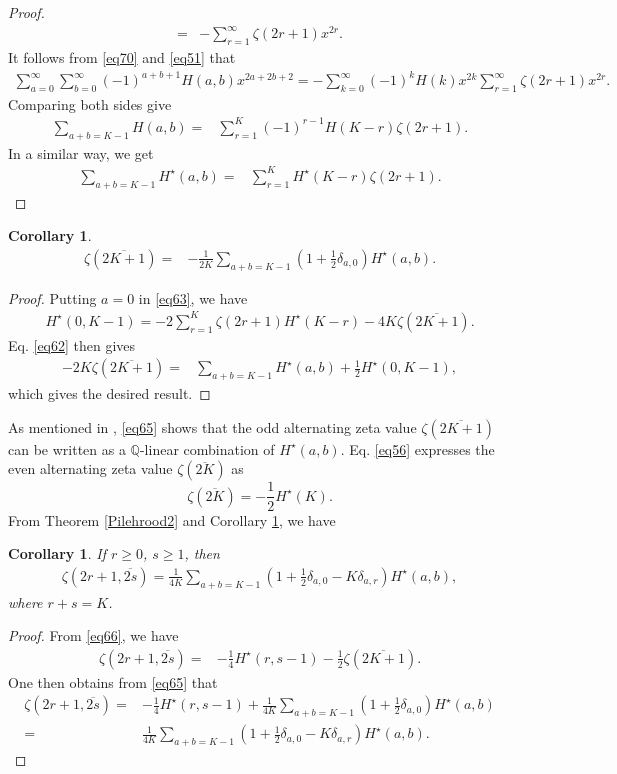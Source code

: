 \documentclass[reqno]{amsart}
\newtheorem{corollary}[theorem]{Corollary}
\theoremstyle{definition}
\theoremstyle{remark}
\numberwithin{equation}{section}
\begin{document}
\begin{proof}
\begin{align*}
=&-\sum_{r=1}^{\infty}\zeta(2r+1)x^{2r}.
\end{align*}
It follows from \eqref{eq70} and \eqref{eq51} that
\begin{align*}
\sum_{a=0}^{\infty}\sum_{b=0}^{\infty}(-1)^{a+b+1}H(a,b)x^{2a+2b+2}=-\sum_{k=0}^{\infty}(-1)^kH(k)x^{2k} \sum_{r=1}^{\infty}\zeta(2r+1)x^{2r}.
\end{align*}
Comparing both sides give
\begin{align*}
\sum_{a+b=K-1}H(a,b)=&\sum_{r=1}^K(-1)^{r-1}H(K-r)\zeta(2r+1).
\end{align*}
In a similar way, we get
\begin{align*}
\sum_{a+b=K-1}H^{\star}(a,b)=& \sum_{r=1}^{K}H^{\star}(K-r)\zeta(2r+1).
\end{align*}
\end{proof}
\begin{corollary}\label{cor2}
\begin{align}\label{eq65}
\zeta(\overline{2K+1})=&-\frac{1}{2K} \sum_{a+b=K-1}\left(1+\frac{1}{2} \delta_{a,0}\right)H^{\star}(a,b).
\end{align}
\end{corollary}
\begin{proof}
Putting $a=0$ in \eqref{eq63}, we have
\begin{align*}
H^{\star}(0, K-1)=-2\sum_{r=1}^K\zeta(2r+1)H^{\star}(K-r)-4K\zeta(\overline{2K+1}).
\end{align*}
Eq. \eqref{eq62} then gives
\begin{align*}
-2K\zeta(\overline{2K+1})=&\sum_{a+b=K-1}H^{\star}(a,b)+\frac{1}{2}H^{\star}(0, K-1),
\end{align*}which gives the desired result.
\end{proof}
As mentioned in \cite{1}, \eqref{eq65} shows that the odd alternating zeta value $\zeta(\overline{2K+1})$ can be written as a $\mathbb{Q}$-linear combination of $H^{\star}(a, b)$. Eq. \eqref{eq56} expresses the even alternating zeta value $\zeta(\overline{2K})$ as
$$\zeta(\overline{2K})=-\frac{1}{2}H^{\star}(K).$$
From Theorem \ref{Pilehrood2} and Corollary \ref{cor2}, we have
\begin{corollary}
If $r\geq 0$, $s\geq 1$, then
\begin{align*}
\zeta(2r+1, \overline{2s})=\frac{1}{4K} \sum_{a+b=K-1}\left(1+\frac{1}{2} \delta_{a,0}-K\delta_{a, r}\right)H^{\star}(a,b),
\end{align*}where $r+s=K$.
\end{corollary}
\begin{proof}
From \eqref{eq66}, we have
\begin{align*}
\zeta(2r+1, \overline{2s})=&-\frac{1}{4}H^{\star}(r, s-1)-\frac{1}{2}\zeta(\overline{2K+1}).
\end{align*}One then obtains from \eqref{eq65} that
\begin{align*}
\zeta(2r+1, \overline{2s})=&-\frac{1}{4}H^{\star}(r, s-1)+\frac{1}{4K} \sum_{a+b=K-1}\left(1+\frac{1}{2} \delta_{a,0}\right)H^{\star}(a,b)\\
=&\frac{1}{4K} \sum_{a+b=K-1}\left(1+\frac{1}{2} \delta_{a,0}-K\delta_{a, r}\right)H^{\star}(a,b).
\end{align*}
\end{proof}
\end{document}
